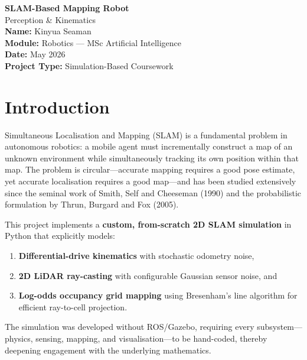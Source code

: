 \documentclass[12pt,a4paper]{article}
\begin{document}
\begin{titlepage}
\centering
\vspace*{3cm}
{\Huge\bfseries SLAM-Based Mapping Robot\\[0.4cm]}
{\Large Perception \& Kinematics}\\[2cm]
{\large\textbf{Name:} Kinyua Seaman}\\[0.3cm]
{\large\textbf{Module:} Robotics --- MSc Artificial Intelligence}\\[0.5cm]
{\large\textbf{Date:} May 2026}\\[0.5cm]
{\large\textbf{Project Type:} Simulation-Based Coursework}\\[3cm]
\vfill
\end{titlepage}

\tableofcontents
\newpage

\section{Introduction}

Simultaneous Localisation and Mapping (SLAM) is a fundamental problem in autonomous robotics: a mobile agent must incrementally construct a map of an unknown environment while simultaneously tracking its own position within that map. The problem is circular---accurate mapping requires a good pose estimate, yet accurate localisation requires a good map---and has been studied extensively since the seminal work of Smith, Self and Cheeseman (1990) and the probabilistic formulation by Thrun, Burgard and Fox (2005).

This project implements a \textbf{custom, from-scratch 2D SLAM simulation} in Python that explicitly models:

\begin{enumerate}
    \item \textbf{Differential-drive kinematics} with stochastic odometry noise,
    \item \textbf{2D LiDAR ray-casting} with configurable Gaussian sensor noise, and
    \item \textbf{Log-odds occupancy grid mapping} using Bresenham's line algorithm for efficient ray-to-cell projection.
\end{enumerate}

The simulation was developed without ROS/Gazebo, requiring every subsystem---physics, sensing, mapping, and visualisation---to be hand-coded, thereby deepening engagement with the underlying mathematics.
\end{document}
